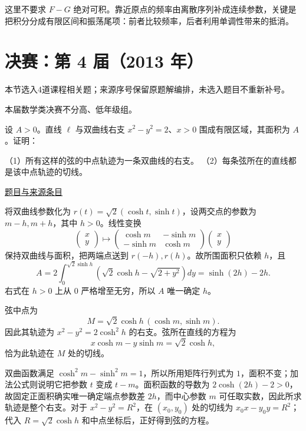 \documentclass[12pt,fontset=fandol]{ctexart}
\begin{document}
\begin{remark}[方法与条件]这里不要求 $F-G$ 绝对可积。靠近原点的频率由离散序列补成连续参数，关键是把积分分成有限区间和振荡尾项：前者比较频率，后者利用单调性带来的抵消。\end{remark}

\section{决赛：第 4 届（2013 年）}

本节选入4道课程相关题；来源序号保留原题解编排，未选入题目不重新补号。

\begin{remark}[来源说明]本届数学类决赛不分高、低年级组。\end{remark}

\begin{example}[来源序号1]\label{ex:fin04-all:1}\label{pr:fin04-all:1}

设 $A>0$。直线 $\ell$ 与双曲线右支 $x^2-y^2=2$、$x>0$ 围成有限区域，其面积为 $A$。证明：

（1）所有这样的弦的中点轨迹为一条双曲线的右支。
（2）每条弦所在的直线都是该中点轨迹的切线。

\par\href{https://github.com/lzxcr/cmc-mathematics/blob/64916fa1fdbc3e444a652eca204d5669058ee321/src/problems/finals/04/01.md}{题目与来源条目}

\end{example}

\begin{solve}\label{ans:fin04-all:1}

将双曲线参数化为 $r(t)=\sqrt2(\cosh t,\sinh t)$，设两交点的参数为 $m-h,m+h$，其中 $h>0$。线性变换
\[
\begin{pmatrix}x\\y\end{pmatrix}\longmapsto
\begin{pmatrix}\cosh m&-\sinh m\\-\sinh m&\cosh m\end{pmatrix}
\begin{pmatrix}x\\y\end{pmatrix}
\]
保持双曲线与面积，把两端点送到 $r(-h),r(h)$。故所围面积只依赖 $h$，且
\[
A=2\int_0^{\sqrt2\sinh h}\left(\sqrt2\cosh h-\sqrt{2+y^2}\right)dy
=\sinh(2h)-2h.
\]
右式在 $h>0$ 上从 $0$ 严格增至无穷，所以 $A$ 唯一确定 $h$。

弦中点为
\[
M=\sqrt2\cosh h\,(\cosh m,\sinh m).
\]
因此其轨迹为 $x^2-y^2=2\cosh^2h$ 的右支。弦所在直线的方程为
\[
x\cosh m-y\sinh m=\sqrt2\cosh h,
\]
恰为此轨迹在 $M$ 处的切线。

双曲函数满足 $\cosh^2m-\sinh^2m=1$，所以所用矩阵行列式为 $1$，面积不变；加法公式则说明它把参数 $t$ 变成 $t-m$。面积函数的导数为 $2\cosh(2h)-2>0$，故固定正面积确实唯一确定端点参数差 $2h$，而中心参数 $m$ 可任取实数，因此所求轨迹是整个右支。对于 $x^2-y^2=R^2$，在 $(x_0,y_0)$ 处的切线为 $x_0x-y_0y=R^2$；代入 $R=\sqrt2\cosh h$ 和中点坐标后，正好得到弦的方程。

\end{solve}
\end{document}
